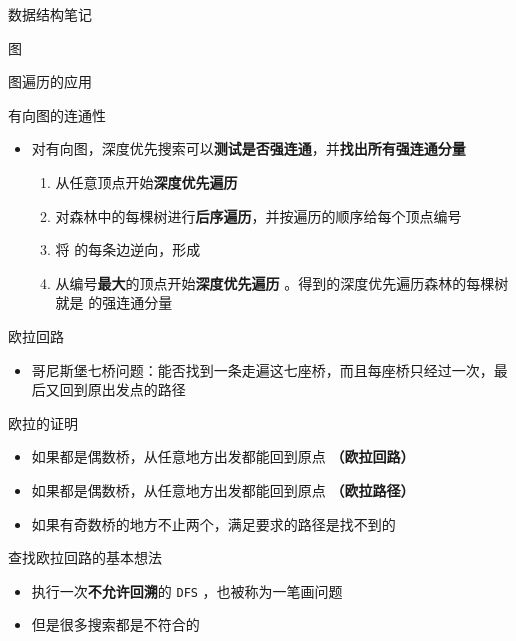 \documentclass[
  ignorenonframetext,
]{beamer}
\providecommand{\tightlist}{%
  \setlength{\itemsep}{0pt}\setlength{\parskip}{0pt}}
\begin{document}
\begin{frame}[fragile]{数据结构笔记}
\begin{block}{图}
\begin{block}{图遍历的应用}
\begin{block}{有向图的连通性}
\protect{}\label{ux6709ux5411ux56feux7684ux8fdeux901aux6027-1}
\begin{itemize}
\tightlist
\item
  对有向图，深度优先搜索可以\textbf{测试是否强连通}，并\textbf{找出所有强连通分量}

  \begin{enumerate}
  \tightlist
  \item
    从任意顶点开始\textbf{深度优先遍历} {}
  \item
    对森林中的每棵树进行\textbf{后序遍历}，并按遍历的顺序给每个顶点编号
  \item
    将 {} 的每条边逆向，形成 {}
  \item
    从编号\textbf{最大}的顶点开始\textbf{深度优先遍历
    {}}。得到的深度优先遍历森林的每棵树就是 {} 的强连通分量
  \end{enumerate}
\end{itemize}
\end{block}

\begin{block}{欧拉回路}
\protect{}\label{ux6b27ux62c9ux56deux8def}
\begin{itemize}
\tightlist
\item
  哥尼斯堡七桥问题：能否找到一条走遍这七座桥，而且每座桥只经过一次，最后又回到原出发点的路径
\end{itemize}


\begin{block}{欧拉的证明}
\protect{}\label{ux6b27ux62c9ux7684ux8bc1ux660e}
\begin{itemize}
\tightlist
\item
  如果都是偶数桥，从任意地方出发都能回到原点 \textbf{（欧拉回路）}
\item
  如果都是偶数桥，从任意地方出发都能回到原点 \textbf{（欧拉路径）}
\item
  如果有奇数桥的地方不止两个，满足要求的路径是找不到的
\end{itemize}
\end{block}

\begin{block}{查找欧拉回路的基本想法}
\protect{}\label{ux67e5ux627eux6b27ux62c9ux56deux8defux7684ux57faux672cux60f3ux6cd5}
\begin{itemize}
\tightlist
\item
  执行一次\textbf{不允许回溯}的 \texttt{DFS} ，也被称为一笔画问题
\item
  但是很多搜索都是不符合的
\end{itemize}
\end{block}


\end{block}
\end{block}
\end{block}
\end{frame}
\end{document}
